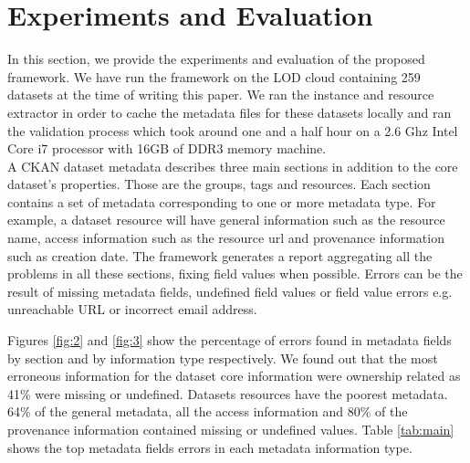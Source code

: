 \documentclass[runningheads,a4paper]{llncs}
\begin{document}

\section{Experiments and Evaluation}
\label{sec:experiment}

In this section, we provide the experiments and evaluation of the proposed framework. We have run the framework on the LOD cloud containing 259 datasets at the time of writing this paper. We ran the instance and resource extractor in order to cache the metadata files for these datasets locally and ran the validation process which took around one and a half hour on a 2.6 Ghz Intel Core i7 processor with 16GB of DDR3 memory machine.\\
A CKAN dataset metadata describes three main sections in addition to the core dataset's properties. Those are the groups, tags and resources. Each section contains a set of metadata corresponding to one or more metadata type. For example, a dataset resource will have general information such as the resource name, access information such as the resource url and provenance information such as creation date. The framework generates a report aggregating all the problems in all these sections, fixing field values when possible. Errors can be the result of missing metadata fields, undefined field values or field value errors e.g. unreachable URL or incorrect email address.

Figures \ref{fig:2} and \ref{fig:3} show the percentage of errors found in metadata fields by section and by information type respectively. We found out that the most erroneous information for the dataset core information were ownership related as 41\% were missing or undefined. Datasets resources have the poorest metadata. 64\% of the general metadata, all the access information and 80\% of the provenance information contained missing or undefined values. Table \ref{tab:main} shows the top metadata fields errors in each metadata information type.
\end{document}
